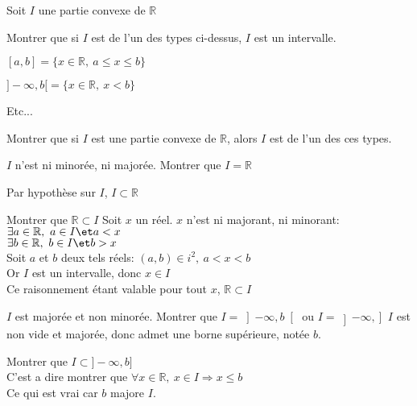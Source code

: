 \documentclass[12pt,twoside,a4paper]{article}
\begin{document}
			\begin{preuve}
				Soit $I$ une partie convexe de $\mathbb{R}$
				\begin{tab}
					\begin{liste}
						\item[\cercle1]Montrer que si $I$ est de l'un des types ci-dessus, $I$ est un intervalle.
							\begin{liste}
								\item $[a,b]=\{x\in\mathbb{R},\ a\leqslant x\leqslant b\}$
								\item $]-\infty,b[=\{x\in\mathbb{R},\ x<b \}$
								\item Etc...
							\end{liste}
						\item[\cercle2]Montrer que si $I$ est une partie convexe de $\mathbb{R}$, alors $I$ est de l'un des ces types.
							\begin{liste}
								\item[\textbullet]$I$ n'est ni minorée, ni majorée. Montrer que $I=\mathbb{R}$
									\begin{liste}
										\item Par hypothèse sur $I$, $I\subset\mathbb{R}$
										\item Montrer que $\mathbb{R}\subset I$
											Soit $x$ un réel. $x$ n'est ni majorant, ni minorant:\\
											$\exists a\in\mathbb{R},\ a\in I\et a<x$\\
											$\exists b\in\mathbb{R},\ b\in I\et b>x$\\
											Soit $a$ et $b$ deux tels réels: $(a,b)\in i^2,\ a<x<b$\\
											Or $I$ est un intervalle, donc $x\in I$\\
											Ce raisonnement étant valable pour tout $x$, $\mathbb{R}\subset I$\\
									\end{liste}
								\item[\textbullet]$I$ est majorée et non minorée. Montrer que $I=\left]-\infty,b\right[$ ou $I=\left]-\infty,\right]$
									$I$ est non vide et majorée, donc admet une borne supérieure, notée $b$.
									\begin{liste}
										\item Montrer que $I\subset ]-\infty,b]$\\
											C'est a dire montrer que $\forall x\in\mathbb{R},\ x\in I\Rightarrow x\leqslant b$\\
											Ce qui est vrai car $b$ majore $I$.

\end{liste}
\end{liste}
\end{liste}
\end{tab}
\end{preuve}
\end{document}
